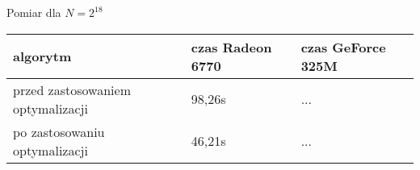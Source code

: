 
Pomiar dla $N = {2}^{18}$

\begin{tabular}{ |p{\dimexpr 0.3\linewidth}|
                  p{\dimexpr 0.3\linewidth}|
                  p{\dimexpr 0.3\linewidth}| }
 \hline algorytm & czas Radeon 6770 & czas GeForce 325M\\
 \hline
 przed zastosowaniem optymalizacji & 98,26s & ...\\
 \hline
 po zastosowaniu optymalizacji & 46,21s & ...\\
 \hline
\end{tabular}

